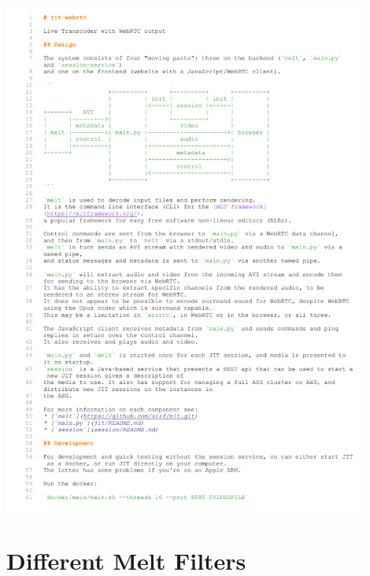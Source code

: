 \documentclass[../MasterThesis.tex]{subfiles}
\begin{document}
\includegraphics[page=2, width=0.9\textwidth]{BE.pdf}














\newpage
\section{Different Melt Filters} \label{appendix:differentMeltFilter}
\end{document}
